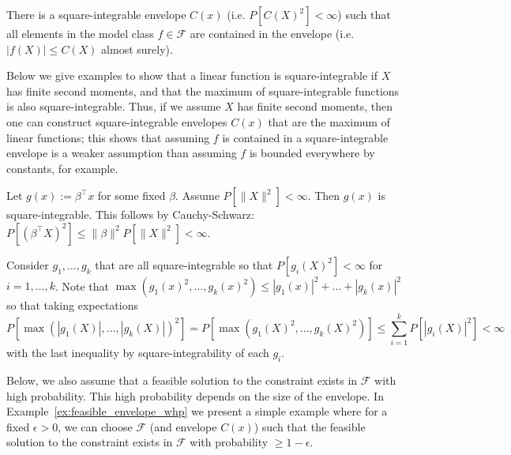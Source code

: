 \begin{assumption}
\label{ass:envelope}
There is a square-integrable envelope $C(x)$ (i.e. $P[C(X)^2]<\infty$) such that all elements in the model class $f\in \mathcal F$ are contained in the envelope (i.e. $|f(X)|\leq C(X)$ almost surely).\end{assumption}
Below we give examples to show that a linear function is square-integrable if $X$ has finite second moments, and that the maximum of square-integrable functions is also square-integrable. Thus, if we assume $X$ has finite second moments, then one can construct square-integrable envelopes $C(x)$ that are the maximum of linear functions;
this shows that assuming $f$ is contained in a square-integrable envelope is a weaker assumption than assuming $f$ is bounded everywhere by constants, for example.

\begin{example}
\label{ex:linear_square_int}
    Let $g(x):=\beta^\top x$ for some fixed $\beta$. Assume $P[\|X\|^2]<\infty$. Then $g(x)$ is square-integrable. %
    This follows by Cauchy-Schwarz: 
    $P[(\beta^\top X)^2]\leq \|\beta\|^2 P[\|X\|^2]<\infty.$
\end{example}


\begin{example}\label{ex:max_square_int}
Consider $g_1,\ldots,g_k$ that are all square-integrable so that $P[g_i(X)^2]<\infty$ for $i=1,\ldots,k$. 
Note that $\max(g_1(x)^2,\ldots,g_k(x)^2)\leq |g_1(x)|^2+\ldots+ |g_k(x)|^2$
so that taking expectations %
$$P[\max(|g_1(X)|,\ldots,|g_k(X)|)^2]
= P[\max(g_1(X)^2,\ldots,g_k(X)^2)]
\leq \sum_{i=1}^k P[|g_i(X)|^2]<\infty$$
with the last inequality by square-integrability of each $g_i$. 
\end{example}

Below, we also assume that a feasible solution to the constraint exists in $\mathcal F$ with high probability. This high probability depends on the size of the envelope. In Example~\ref{ex:feasible_envelope_whp} we present a simple example where for a fixed $\epsilon>0$, we can choose $\mathcal F$ (and envelope $C(x)$) such that the feasible solution to the constraint exists in $\mathcal F$  with probability $\geq 1-\epsilon$. 

